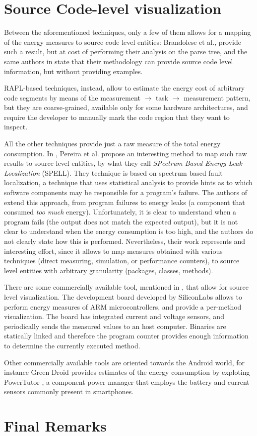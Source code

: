 \section{Source Code-level visualization}

Between the aforementioned techniques, only a few of them allows for a mapping of the energy measures to source code level entities: Brandolese et al., \cite{brando2008} provide such a result, but at cost of performing their analysis on the parse tree, and the same authors in \cite{brando2011} state that their methodology can provide source code level information, but without providing examples. \par 
RAPL-based techniques, instead, allow to estimate the energy cost of arbitrary code segments by means of the measurement $\rightarrow$ task $\rightarrow$ measurement pattern, but they are coarse-grained, available only for some hardware architectures, and require the developer to manually mark the code region that they want to inspect. \par 
All the other techniques provide just a raw measure of the total energy consumption. In \cite{pereira}, Pereira et al. propose an interesting method to map such raw results to source level entities, by what they call \emph{SPectrum Based Energy Leak Localization} (SPELL). They technique is based on spectrum based fault localization, a technique that uses statistical analysis to provide hints as to which software components may be responsible for a program's failure. The authors of \cite{pereira} extend this approach, from program failures to energy leaks (a component that consumed \emph{too much} energy). Unfortunately, it is clear to understand when a program fails (the output does not match the expected output), but it is not clear to understand when the energy consumption is too high, and the authors do not clearly state how this is performed. Nevertheless, their work represents and interesting effort, since it allows to map measures obtained with various techniques (direct measuring, simulation, or performance counters), to source level entities with arbitrary granularity (packages, classes, methods). \par
There are some commercially available tool, mentioned in \cite{rieger}, that allow for source level visualization. The development board developed by SiliconLabs \cite{siliconlab} allows to perform energy measures of ARM microcontrollers, and provide a per-method visualization. The board has integrated current and voltage sensors, and periodically sends the measured values to an host computer. Binaries are statically linked and therefore the program counter provides enough information to determine the currently executed method. \par 
Other commercially available tools are oriented towards the Android world, for instance Green Droid \cite{greendroid} provides estimates of the energy consumption by exploting PowerTutor \cite{powertutor}, a component power manager that employs the battery and current sensors commonly present in smartphones.
\section{Final Remarks}
